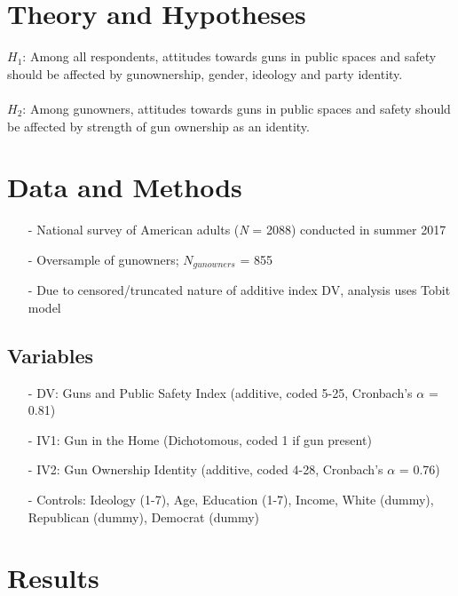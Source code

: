 \documentclass[a0,landscape]{a0poster}
\begin{document}
\begin{multicols}{4}
\section*{Theory and Hypotheses}

$H_1$: Among all respondents, attitudes towards guns in public spaces and safety should be affected by gunownership, gender, ideology and party identity.\\
\\
$H_2$: Among gunowners, attitudes towards guns in public spaces and safety should be affected by strength of gun ownership as an identity.


\section*{Data and Methods}
\large
\begin{itemize}
	\item[-] National survey of American adults (\emph{N} = 2088) conducted in summer 2017
	\item[-] Oversample of gunowners; $N_{gunowners}$ = 855
	\item[-] Due to censored/truncated nature of additive index DV, analysis uses Tobit model
\end{itemize}


\subsection*{Variables}
\large
\begin{itemize}
	\item[-] DV: Guns and Public Safety Index (additive, coded 5-25, Cronbach's $\alpha$ = 0.81)
	\item[-] IV1: Gun in the Home (Dichotomous, coded 1 if gun present)
	\item[-] IV2: Gun Ownership Identity (additive, coded 4-28, Cronbach's $\alpha$ = 0.76)
	\item[-] Controls: Ideology (1-7), Age, Education (1-7), Income, White (dummy), Republican (dummy), Democrat (dummy)
	
\end{itemize}


\section*{Results}
\large
\begin{center}\vspace{1cm}
\begin{tabular}{*{4}{l}}


\end{tabular}
\end{center}
\end{multicols}
\end{document}

